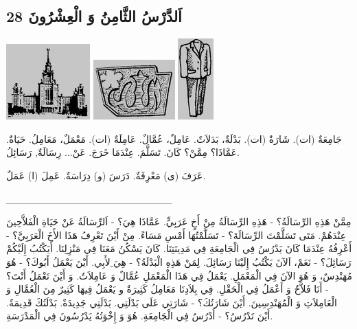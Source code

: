 \documentclass[a5paper]{article}
\begin{document}
\subsection[28 اَلدَّرْسُ الثَّامِنُ وَ الْعِشْرُونَ]{28 اَلدَّرْسُ الثَّامِنُ وَ الْعِشْرُونَ}
 \includegraphics[width=1.2709in,height=1.1457in]{MuhammadBagauddinlatinized-img057.png}   \includegraphics[width=1.2398in,height=0.9063in]{MuhammadBagauddinlatinized-img058.png}   \includegraphics[width=0.5417in,height=1.2291in]{MuhammadBagauddinlatinized-img059.png} 

جَامِعَةٌ (ات). شَارَةٌ (ات). بَدْلَةٌ، بَدَلاَتٌ. عَامِلٌ، عُمَّالٌ. عَامِلَةٌ (ات). مَعْمَلٌ، مَعَامِلُ. حَيَاةٌ. عَمَّاذَا؟ مِمَّنْ؟ كَانَ. تَسَلَّمَ. عِنْدَمَا خَرَجَ. عَنْ... رِسَالَةٌ, رَسَائِلُ.

عَرَفَ (ى) مَعْرِفَةٌ. دَرَسَ (و) دِرَاسَةٌ. عَمِلَ (ا) عَمَلٌ. 

\_\_\_\_\_\_\_\_\_\_\_\_\_\_\_\_\_\_\_\_\_\_\_

مِمَّنْ هَذِهِ الرِّسَالَةُ؟ - هَذِهِ الرِّسَالَةُ مِنْ أَخٍ عَرَبِيٍّ. عَمَّاذَا هِيَ؟ - اَلرِّسَالَةُ عَنْ حَيَاةِ الْفَلاَّحِينَ عِنْدَهُمْ. مَتَى تَسَلَّمْتَ الرِّسَالَةَ؟ - تَسَلَّمْتُهَا أَمْسِ مَسَاءً. مِنْ أَيْنَ تَعْرِفُ هَذَا الأَخَ الْعَرَبِيَّ؟ - أَعْرِفُهُ عِنْدَمَا كَانَ يَدْرُسُ فِي الْجَامِعَةِ فِي مَدِينَتِنَا. كَانَ يَسْكُنُ مَعَنَا فِي مَنْزِلِنَا. أَيَكْتُبُ إِلَيْكُمْ رَسَائِلَ؟ - نَعَمْ، اَلآنَ يَكْتُبُ إِلَيْنَا رَسَائِلَ. لِمَنْ هَذِهِ الْبَدْلَةُ؟ - هِيَ ِلأَبِي. أَيْنَ يَعْمَلُ أَبُوكَ؟ - هُوَ مُهَنْدِسٌ، وَ هُوَ الآنَ فِي الْمَعْمَلِ. يَعْمَلُ فِي هَذَا الْمَعْمَلِ عُمَّالٌ وَ عَامِلاَتٌ. وَ أَيْنَ تَعْمَلُ أَنْتَ؟ - أَنَا فَلاَّحٌ وَ أَعْمَلُ فِي الْحَقْلِ. فِي بِلاَدِنَا مَعَامِلُ كَثِيرَةٌ و يَعْمَلُ فِيهَا كَثِيرٌ مِنَ الْعُمَّالِ وَ الْعَامِلاَتِ وَ الْمُهَنْدِسِينَ. أَيْنَ شَارَتُكَ؟ - شَارَتِي عَلَى بَدْلَتِي. بَدْلَتِي جَدِيدَةٌ. بَدْلَتُكَ قَدِيمَةٌ. أَيْنَ تَدْرُسُ؟ - أَدْرُسُ فِي الْجَامِعَةِ. هُوَ وَ إِخْوَتُهُ يَدْرُسُونَ فِي الْمَدْرَسَةِ.
\end{document}

